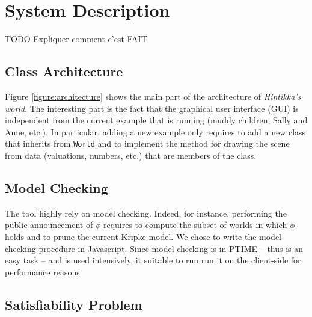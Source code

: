 \documentclass{article}
\begin{document}
\section{System Description}
\label{section:architecture}

TODO Expliquer comment c'est FAIT

\subsection{Class Architecture}

Figure \ref{figure:architecture} shows the main part of the architecture of \emph{Hintikka's world}. The interesting part is the fact that the graphical user interface (GUI) is independent from the current example that is running (muddy children, Sally and Anne, etc.). In particular, adding a new example only requires to add a new class that inherits from \texttt{World} and to implement the method for drawing the scene from data (valuations, numbers, etc.) that are members of the class.

\subsection{Model Checking}

The tool highly rely on model checking. Indeed, for instance, performing the public announcement of $\phi$ requires to compute the subset of worlds in which $\phi$ holds and to prune the current Kripke model. We chose to write the  model checking procedure in Javascript. Since model checking is in PTIME -- thus is an easy task -- and is used intensively, it suitable to run run it on the client-side  for performance reasons.

\subsection{Satisfiability Problem}
\end{document}
